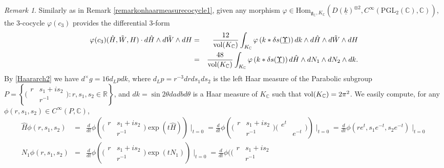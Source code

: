 \documentclass{amsart}
\theoremstyle{definition}
\theoremstyle{remark}
\newtheorem{remark}[theorem]{Remark}
\numberwithin{equation}{section}
\newcommand{\PGL}{{\mathrm{PGL}}}
\newcommand{\C}{{\mathbb C}}
\newcommand{\R}{{\mathbb R}}
\newcommand{\mfg}{{\mathfrak g}}
\newcommand{\Hom}{{\mathrm {Hom}}}
\begin{document}
\begin{remark}\label{remarkonhaarmeasurecocycle2}
    Similarly as in Remark \ref{remarkonhaarmeasurecocycle1}, given any morphism $\varphi\in\Hom_{\mfg_\C,K_\C}(D(\underline k)^{\otimes 2},C^\infty(\PGL_2(\C),\C))$, the 3-cocycle $\varphi(c_3)$ provides the differential 3-form 
    \begin{eqnarray*}
    \varphi(c_3)(\hat H,\tilde W,H)\cdot d\hat H\wedge d\tilde W \wedge dH&=&\frac{12}{{\rm vol}(K_\C)}\int_{K_\C}\varphi\left(k\ast \delta s(\underline\Upsilon)\right)d k\wedge d\hat H\wedge d\tilde W \wedge dH\\
    &=&\frac{48}{{\rm vol}(K_\C)}\int_{K_\C}\varphi\left(k\ast \delta s(\underline\Upsilon)\right)d\hat H\wedge dN_1 \wedge dN_2\wedge d k. 
    \end{eqnarray*}
    By \eqref{Haararch2} we have  $d^\times g=16d_Lp dk$, where $d_Lp=r^{-3} drds_1ds_2$ is the left Haar measure of the Parabolic subgroup $P=\left\{\big(\begin{smallmatrix}
        r&s_1+is_2\\&r^{-1}
    \end{smallmatrix}\big)\colon  r,s_1,s_2\in\R\right\}$, and $dk=\sin2\theta dadbd\theta$ is a Haar measure of $K_\C$ such that ${\rm vol}(K_\C)=2\pi^2$. We easily compute, for any $\phi(r,s_1,s_2)\in C^\infty(P,\C)$,
    \begin{eqnarray*}
        \hat H\phi(r,s_1,s_2)&=&\frac{d}{dt}\phi(\big(\begin{smallmatrix}
        r&s_1+is_2\\&r^{-1}
    \end{smallmatrix}\big)\exp(t\hat H))\mid_{t=0}=\frac{d}{dt}\phi(\big(\begin{smallmatrix}
        r&s_1+is_2\\&r^{-1}
    \end{smallmatrix}\big)\big(\begin{smallmatrix}
        e^t&\\&e^{-t}
    \end{smallmatrix}\big))\mid_{t=0}=\frac{d}{dt}\phi(re^t,s_1e^{-t},s_2e^{-t})\mid_{t=0}\\
    N_1\phi(r,s_1,s_2)&=&\frac{d}{dt}\phi(\big(\begin{smallmatrix}
        r&s_1+is_2\\&r^{-1}
    \end{smallmatrix}\big)\exp(tN_1))\mid_{t=0}=\frac{d}{dt}\phi(\big(\begin{smallmatrix}
        r&s_1+is_2\\&r^{-1}

\end{smallmatrix}
\end{eqnarray*}
\end{remark}
\end{document}
